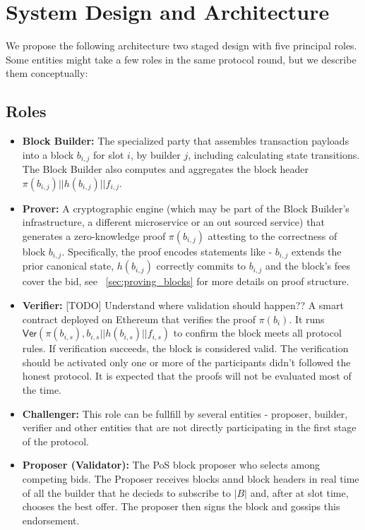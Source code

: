 \documentclass[11pt]{article}
\begin{document}
\section{System Design and Architecture}
\label{sec:architecture}
We propose the following architecture two staged design with five principal roles. Some entities might take a few roles in the same protocol round, but we describe them conceptually:

\subsection{Roles}
\begin{itemize}
    \item \textbf{Block Builder:} The specialized party that assembles transaction payloads into a block $b_{i,j}$ for slot $i$, by builder $j$, including calculating state transitions. The Block Builder also computes and aggregates the block header $\pi(b_{i,j})||h(b_{i,j})||f_{i,j}$. 
    \item \textbf{Prover:} A cryptographic engine (which may be part of the Block Builder’s infrastructure, a different microservice or an out sourced service) that generates a zero-knowledge proof $\pi(b_{i,j})$ attesting to the correctness of block $b_{i,j}$. Specifically, the proof encodes statements like - $b_{i,j}$ extends the prior canonical state, $h(b_{i,j})$ correctly commits to $b_{i,j}$ and the block’s fees cover the bid, see ~\ref{sec:proving_blocks} for more details on proof structure.
    \item \textbf{Verifier:} 
    [TODO] Understand where validation should happen??
    A smart contract deployed on Ethereum that verifies the proof $\pi(b_i)$. It runs $\mathsf{Ver}(\pi(b_{i,s}), b_{i,s}||h(b_{i,s})||f_{i,s})$ to confirm the block meets all protocol rules. If verification succeeds, the block is considered valid.
    The verification should be activated only one or more of the participants didn't followed the honest protocol. It is expected that the proofs will not be evaluated most of the time.

    \item \textbf{Challenger:} This role can be fullfill by several entities - proposer, builder, verifier and other entities that are not directly participating in the first stage of the protocol.
    \item \textbf{Proposer (Validator):} The PoS block proposer who selects among competing bids. The Proposer receives blocks annd block headers in real time of all the builder that he decieds to subscribe to $|B|$ and, after at slot time, chooses the best offer. The proposer then signs the block and gossips this endorsement.
\end{itemize}
\end{document}
